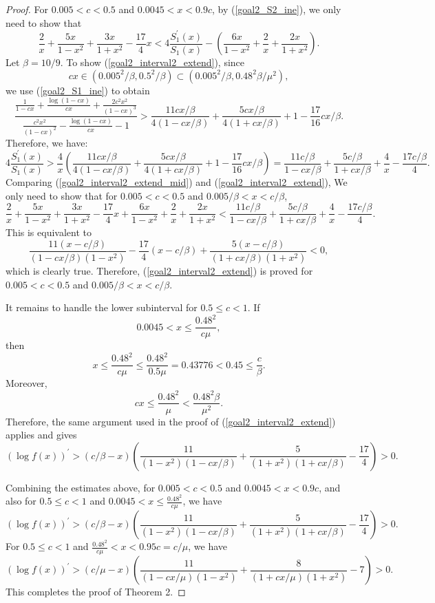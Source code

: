 ﻿\documentclass[10pt]{article}
\begin{document}
\begin{proof}
For $0.005<c<0.5$ and $0.0045<x<0.9c$, by (\ref{goal2_S2_ine}), we only need to show that
\begin{equation}
    \frac{2}{x}+\frac{5x}{1-x^2}+\frac{3x}{1+x^2}-\frac{17}{4}x<4\frac{S_1^{'}(x)}{S_1(x)}-\left(\frac{6x}{1-x^2}+\frac{2}{x}+\frac{2x}{1+x^2}\right). \label{goal2_interval2_extend}
\end{equation}
Let $\beta = 10/9$. To show (\ref{goal2_interval2_extend}), since
\[
cx\in(0.005^2/\beta,0.5^2/\beta)
\subset (0.005^2/\beta,0.48^2\beta/\mu^2),
\]
we use (\ref{goal2_S1_ine}) to obtain
\begin{equation}
        \frac{\frac{1}{1-cx}+\frac{\log(1-cx)}{cx}+\frac{2c^2x^2}{(1-cx)^3}}{\frac{c^2x^2}{(1-cx)^{2}}-\frac{\log(1-cx)}{cx}-1}>\frac{11cx/\beta}{4(1-cx/\beta)}+\frac{5cx/\beta}{4(1+cx/\beta)}+1-\frac{17}{16}cx/\beta.
\end{equation}
Therefore, we have:
\begin{equation}
    4\frac{S_1^{'}(x)}{S_1(x)}>\frac{4}{x}\left(\frac{11cx/\beta}{4(1-cx/\beta)}+\frac{5cx/\beta}{4(1+cx/\beta)}+1-\frac{17}{16}cx/\beta\right) = \frac{11c/\beta}{1-cx/\beta}+\frac{5c/\beta}{1+cx/\beta}+\frac{4}{x}-\frac{17c/\beta}{4}.
\label{goal2_interval2_extend_mid}
\end{equation}
Comparing (\ref{goal2_interval2_extend_mid}) and (\ref{goal2_interval2_extend}),
We only need to show that for $0.005<c<0.5$ and $0.005/\beta<x<c/\beta$,
$$\frac{2}{x}+\frac{5x}{1-x^2}+\frac{3x}{1+x^2}-\frac{17}{4}x+\frac{6x}{1-x^2}+\frac{2}{x}+\frac{2x}{1+x^2}<\frac{11c/\beta}{1-cx/\beta}+\frac{5c/\beta}{1+cx/\beta}+\frac{4}{x}-\frac{17c/\beta}{4}.
$$
This is equivalent to
$$\frac{11(x-c/\beta)}{(1-cx/\beta)(1-x^2)}-\frac{17}{4}(x-c/\beta)+\frac{5(x-c/\beta)}{(1+cx/\beta)(1+x^2)}<0,
$$
which is clearly true. Therefore, (\ref{goal2_interval2_extend}) is proved for $0.005<c<0.5$ and $0.005/\beta<x<c/\beta$.

It remains to handle the lower subinterval for $0.5\leq c<1$. If
\[
0.0045<x\leq \frac{0.48^2}{c\mu},
\]
then
\[
x\leq \frac{0.48^2}{c\mu}\leq \frac{0.48^2}{0.5\mu}=0.43776
<0.45\leq \frac{c}{\beta}.
\]
Moreover,
\[
cx\leq \frac{0.48^2}{\mu}<\frac{0.48^2\beta}{\mu^2}.
\]
Therefore, the same argument used in the proof of
(\ref{goal2_interval2_extend}) applies and gives
\[
(\log f(x))^{'}
>
(c/\beta-x)\left(\frac{11}{(1-x^2)(1-cx/\beta)}
+\frac{5}{(1+x^2)(1+cx/\beta)}-\frac{17}{4}\right)>0.
\]

Combining the estimates above, for $0.005<c<0.5$ and
$0.0045<x<0.9c$, and also for $0.5\leq c<1$ and
$0.0045<x\leq \frac{0.48^2}{c\mu}$, we have
\[
(\log f(x))^{'}
>
(c/\beta-x)\left(\frac{11}{(1-x^2)(1-cx/\beta)}
+\frac{5}{(1+x^2)(1+cx/\beta)}-\frac{17}{4}\right)>0.
\]
For $0.5\leq c<1$ and
$\frac{0.48^2}{c\mu}<x<0.95c=c/\mu$, we have
\[
(\log f(x))^{'}
>
(c/\mu-x)\left(\frac{11}{(1-cx/\mu)(1-x^2)}
+\frac{8}{(1+cx/\mu)(1+x^2)}-7\right)>0.
\]
This completes the proof of Theorem 2.
\end{proof}


\end{document}
